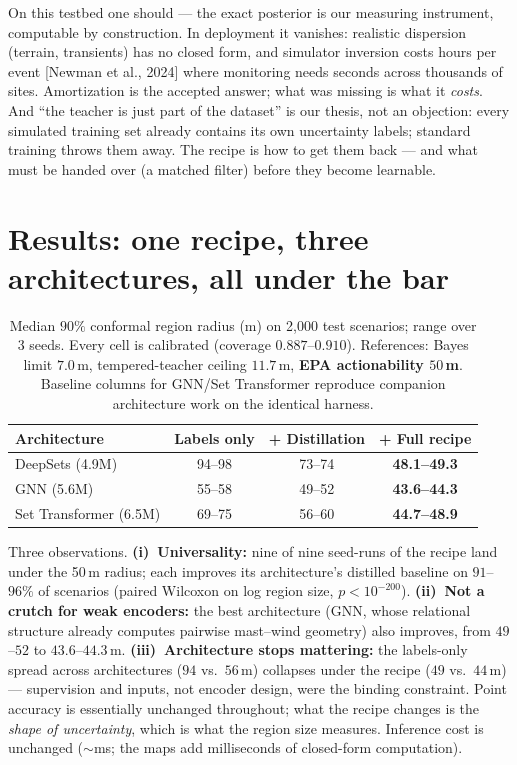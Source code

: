\documentclass{article}
\begin{document}
\begin{tcolorbox}[title=Why not just use the teacher?,left=1mm,right=1mm,top=0.5mm,bottom=0.5mm]
\small On this testbed one should --- the exact posterior is our measuring
instrument, computable by construction. In deployment it vanishes: realistic
dispersion (terrain, transients) has no closed form, and simulator inversion
costs hours per event [Newman et al., 2024] where monitoring needs seconds
across thousands of sites. Amortization is the accepted answer; what was
missing is what it \emph{costs}. And ``the teacher is just part of the
dataset'' is our thesis, not an objection: every simulated training set
already contains its own uncertainty labels; standard training throws them
away. The recipe is how to get them back --- and what must be handed over
(a matched filter) before they become learnable.
\end{tcolorbox}

\section{Results: one recipe, three architectures, all under the bar}

\begin{table}[h]
\centering\small
\caption{Median $90\%$ conformal region radius (m) on 2{,}000 test scenarios;
range over 3 seeds. Every cell is calibrated (coverage $0.887$--$0.910$).
References: Bayes limit $7.0$\,m, tempered-teacher ceiling $11.7$\,m,
\textbf{EPA actionability $50$\,m}. Baseline columns for GNN/Set Transformer
reproduce companion architecture work on the identical harness.}
\begin{tabular}{lccc}
\toprule
Architecture & Labels only & + Distillation & + \textbf{Full recipe} \\
\midrule
DeepSets (4.9M)        & 94--98 & 73--74 & \textbf{48.1--49.3} \\
GNN (5.6M)             & 55--58 & 49--52 & \textbf{43.6--44.3} \\
Set Transformer (6.5M) & 69--75 & 56--60 & \textbf{44.7--48.9} \\
\bottomrule
\end{tabular}
\label{tab:factorial}
\end{table}

Three observations. \textbf{(i)~Universality:} nine of nine seed-runs of the
recipe land under the 50\,m radius; each improves its architecture's distilled
baseline on $91$--$96\%$ of scenarios (paired Wilcoxon on log region size,
$p<10^{-200}$). \textbf{(ii)~Not a crutch for weak encoders:} the best
architecture (GNN, whose relational structure already computes pairwise
mast--wind geometry) also improves, from $49$--$52$ to $43.6$--$44.3$\,m.
\textbf{(iii)~Architecture stops mattering:} the labels-only spread across
architectures ($94$ vs.\ $56$\,m) collapses under the recipe ($49$ vs.\
$44$\,m) --- supervision and inputs, not encoder design, were the binding
constraint. Point accuracy is essentially unchanged throughout; what the
recipe changes is the \emph{shape of uncertainty}, which is what the region
size measures. Inference cost is unchanged ($\sim$ms; the maps add
milliseconds of closed-form computation).
\end{document}
